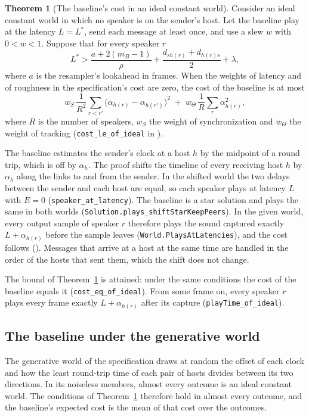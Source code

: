 \documentclass[11pt,a4paper]{article}
\newcommand{\lean}[1]{\texttt{#1}}
\theoremstyle{definition}
\newtheorem{theorem}[definition]{Theorem}
\begin{document}
\begin{theorem}[The baseline's cost in an ideal constant world]\label{thm:exact}
Consider an ideal constant world in which no speaker is on the sender's
host. Let the baseline play at the latency $L = L^*$, send each message at
least once, and use a slew $w$ with $0 < w < 1$. Suppose that for every
speaker $r$
\[
  L^* > \frac{a + 2(m_B - 1)}{\rho} + \frac{d_{s h(r)} + d_{h(r) s}}{2}
    + \lambda,
\]
where $a$ is the resampler's lookahead in frames. When the weights of
latency and of roughness in the specification's cost are zero, the cost of
the baseline is at most
\[
  w_S\,\frac{1}{R^2}\sum_{r < r'}
      \bigl(\alpha_{h(r)} - \alpha_{h(r')}\bigr)^2
    \;+\; w_\Theta\,\frac{1}{R}\sum_r \alpha_{h(r)}^2,
\]
where $R$ is the number of speakers, $w_S$ the weight of synchronization
and $w_\Theta$ the weight of tracking (\lean{cost\_le\_of\_ideal} in
).
\end{theorem}

The baseline estimates the sender's clock at a host $h$ by the midpoint of
a round trip, which is off by $\alpha_h$. The proof shifts the timeline of
every receiving host $h$ by $\alpha_h$ along the links to and from the
sender. In the shifted world the two delays between the sender and each
host are equal, so each speaker plays at latency $L$ with $E = 0$
(\lean{speaker\_at\_latency}). The baseline is a star solution and plays
the same in both worlds (\lean{Solution.plays\_shiftStarKeepPeers}). In
the given world, every output sample of speaker $r$ therefore plays the
sound captured exactly $L + \alpha_{h(r)}$ before the sample leaves
(\lean{World.PlaysAtLatencies}), and the cost follows
(). Messages that arrive at a
host at the same time are handled in the order of the hosts that sent them,
which the shift does not change.

The bound of Theorem~\ref{thm:exact} is attained: under the same conditions
the cost of the baseline equals it (\lean{cost\_eq\_of\_ideal}). From some
frame on, every speaker $r$ plays every frame exactly $L + \alpha_{h(r)}$
after its capture (\lean{playTime\_of\_ideal}).

\subsection{The baseline under the generative world}

The generative world of the specification draws at random the offset of each
clock and how the least round-trip time of each pair of hosts divides
between its two directions. In its noiseless members, almost every outcome
is an ideal constant world. The conditions of Theorem~\ref{thm:exact}
therefore hold in almost every outcome, and the baseline's expected cost is
the mean of that cost over the outcomes.
\end{document}
